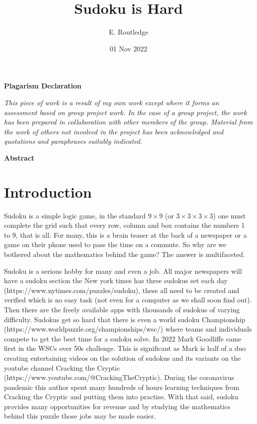 \documentclass[a4paper,11pt]{report}
\author{E. Routledge}
\date{01 Nov 2022}
\title{Sudoku is Hard}
\newcounter{row}
\newcounter{col}
\begin{document}
\lstset{language=Python}

\begin{center}{\huge\textbf{Plagarism Declaration}}\end{center}
\textit{This piece of work is a result of my own work except where it forms an assessment based on group project work. In the case of a group project, the work has been prepared in collaboration with other members of the group. Material from the work of others not involved in the project has been acknowledged and quotations and paraphrases suitably indicated.}
\begin{center}{\textbf{Abstract}}\end{center}

\tableofcontents
\chapter{Introduction}

Sudoku is a simple logic game, in the standard $9 \times 9$ (or $3 \times 3 \times 3 \times 3$) one must complete the grid such that every row, column and box contains the numbers 1 to 9, that is all. For many, this is a brain teaser at the back of a newspaper or a game on their phone used to pass the time on a commute. So why are we bothered about the mathematics behind the game? The answer is multifaceted. 

Sudoku is a serious hobby for many and even a job. All major newspapers will have a sudoku section the New york times has three sudokus set each day (https://www.nytimes.com/puzzles/sudoku), these all need to be created and verified which is no easy task (not even for a computer as we shall soon find out). Then there are the freely available apps with thousands of sudokus of varying difficulty. Sudokus get so hard that there is even a world sudoku Championship (https://www.worldpuzzle.org/championships/wsc/) where teams and individuals compete to get the best time for a sudoku solve. In 2022 Mark Goodliffe came first in the WSCs over 50s challenge. This is significant as Mark is half of a duo creating entertaining videos on the solution of sudokus and its variants on the youtube channel Cracking the Cryptic (https://www.youtube.com/@CrackingTheCryptic). During the coronavirus pandemic this author spent many hundreds of hours learning techniques from Cracking the Cryptic and putting them into practise. With that said, sudoku provides many opportunities for revenue and by studying the mathematics behind this puzzle those jobs may be made easier.
\end{document}
